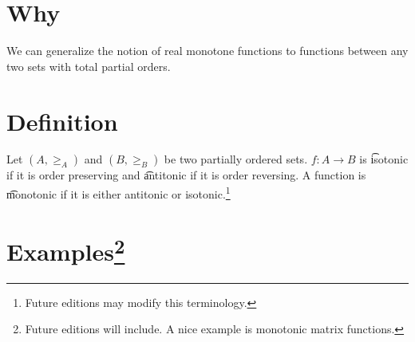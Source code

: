 

\section*{Why}

We can generalize the notion of real monotone functions to functions between any two sets with total partial orders.

\section*{Definition}

Let $(A, \geq_A)$ and $(B, \geq_B)$ be two partially ordered sets.
$f:A \to B$ is \t{isotonic} if it is order preserving and \t{antitonic} if it is order reversing.
A function is \t{monotonic} if it is either antitonic or isotonic.\footnote{Future editions may modify this terminology.}

\section*{Examples\footnote{Future editions will include. A nice example is monotonic matrix functions.}}

\blankpage